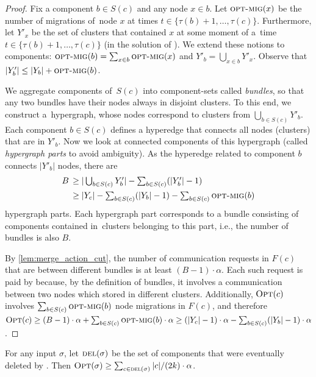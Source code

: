 \begin{proof}
Fix a component $b \in S(c)$ and any node $x \in b$. Let $\textsc{opt-mig}(x)$ be the
number of \OPT migrations of~node $x$ at times $t \in \{ \tau(b)+1, \ldots,
\tau(c) \}$. Furthermore, let $Y'_x$ be the set of clusters that
contained $x$ at some moment of a~time $t \in \{ \tau(b)+1, \ldots, \tau(c)
\}$ (in the solution of \OPT). We extend these notions to components:
$\textsc{opt-mig}(b) = \sum_{x \in b} \textsc{opt-mig}(x)$ and $Y'_b = \bigcup_{x \in b} Y'_x$.
Observe that $|Y'_b| \leq |Y_b| + \textsc{opt-mig}(b)$.

We aggregate components of~$S(c)$ into component-sets called \emph{bundles},
so that any two bundles have their nodes always in disjoint clusters. To this
end, we construct a~hypergraph, whose nodes correspond to clusters from
$\bigcup_{b \in S(c)} Y'_b$. Each component $b \in S(c)$ defines a hyperedge
that connects all nodes (clusters) that are in $Y'_b$. Now we look at
connected components of this hypergraph (called \emph{hypergraph parts} to avoid
ambiguity). As the hyperedge related to component $b$ connects $|Y'_b|$ nodes,
there are
\begin{align*}
	B \,
	\geq &\; \textstyle |\bigcup_{b \in S(c)} Y'_b| - \sum_{b \in S(c)} (|Y'_b|-1) \\
	\geq &\; \textstyle |Y_c| - \sum_{b \in S(c)} (|Y_b|-1) - \sum_{b \in S(c)} \textsc{opt-mig}(b)
\end{align*}
hypergraph parts. Each hypergraph part corresponds to a bundle consisting of
components contained in~clusters belonging to this part, i.e., the number of
bundles is also $B$.

By \ref{lem:merge_action_cut}, the number of communication requests in
$F(c)$ that are between different bundles is at least $(B-1) \cdot \alpha$.
Each such request is paid by \OPT because, by the definition of bundles, it involves
a communication between two nodes which \OPT stored in different clusters.
Additionally, $\textsc{Opt}(c)$ involves $\sum_{b \in S(c)}
\textsc{opt-mig}(b)$ node migrations in $F(c)$, and therefore $\textsc{Opt}(c) \geq (B-1) \cdot
\alpha + \sum_{b \in S(c)} \textsc{opt-mig}(b) \cdot \alpha
\geq (|Y_c|-1) \cdot \alpha - \sum_{b \in S(c)} (|Y_b|-1) \cdot \alpha$.
\end{proof}



\begin{lemma}
\label{lem:opt_lower_bound}
For any input $\sigma$, let $\textsc{del}(\sigma)$ be the set of components that were
eventually deleted by \CREP. Then $\textsc{Opt}(\sigma) \geq \sum_{c \in \textsc{del}(\sigma)}
|c| / (2k) \cdot \alpha$.
\end{lemma}

